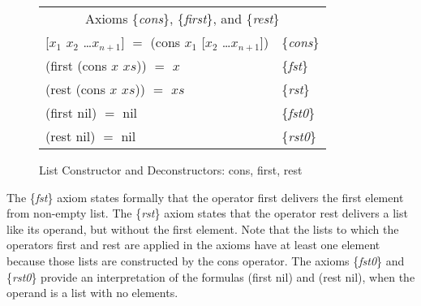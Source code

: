 \begin{figure}
\begin{tabular}{ll}
 \multicolumn{2}{c}{Axioms \{\emph{cons}\}, \{\emph{first}\}, and \{\emph{rest}\}} \\
 \textsf{[$x_1$ $x_2$ \dots $x_{n+1}$]} $=$ \textsf{(cons $x_1$ [$x_2$ \dots $x_{n+1}$])} & \{\emph{cons}\} \\
 \hline
 \textsf{(first (cons $x$ $xs$))} $=$ $x$                                        & \{\emph{fst}\}\\
 \textsf{(rest (cons $x$ $xs$))}  $=$ $xs$                                       & \{\emph{rst}\} \\
 \textsf{(first nil)} $=$ \textsf{nil}                                           & \{\emph{fst0}\}\\
 \textsf{(rest nil)} $=$ \textsf{nil}                                            & \{\emph{rst0}\}\\
\end{tabular}
\caption{List Constructor and Deconstructors: \textsf{cons}, \textsf{first}, \textsf{rest}}
\label{first-rest-cons}
\end{figure}

The \{\emph{fst}\} axiom states formally that
the operator \textsf{first} delivers the first element from non-empty list.
The \{\emph{rst}\} axiom states that the operator \textsf{rest} delivers
a list like its operand, but without the first element.
Note that the lists to which the operators \textsf{first} and \textsf{rest}
are applied in the axioms have at least one element
because those lists are constructed by the \textsf{cons} operator.
The axioms
\{\emph{fst0}\} and \{\emph{rst0}\}
provide an interpretation of the formulas
\textsf{(first nil)} and \textsf{(rest nil)},
when the operand is a list with no elements.

